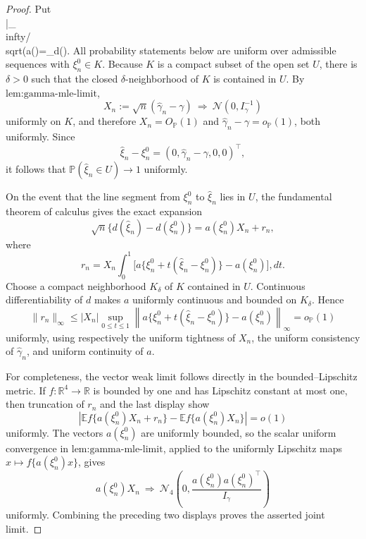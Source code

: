 \documentclass{article}
\begin{document}
\begin{proof}
Put \\|\_\\infty/\\sqrt(a(\xi)=\partial\_\gamma d(\xi)\).  All probability statements below are uniform over admissible sequences with \(\xi_n^0\in K\).  Because \(K\) is a compact subset of the open set \(U\), there is \(\delta>0\) such that the closed \(\delta\)-neighborhood of \(K\) is contained in \(U\).  By \(\text{lem:gamma-mle-limit}\),
\[
 X_n:=\sqrt n(\widehat\gamma_n-\gamma)
 \ \Rightarrow\ \mathcal N(0,I_\gamma^{-1})
\]
uniformly on \(K\), and therefore \(X_n=O_{\mathbb P}(1)\) and \(\widehat\gamma_n-\gamma=o_{\mathbb P}(1)\), both uniformly.  Since
\[
 \widehat\xi_n-\xi_n^0=(0,\widehat\gamma_n-\gamma,0,0)^\top,
\]
it follows that \(\mathbb P(\widehat\xi_n\in U)\to1\) uniformly.

On the event that the line segment from \(\xi_n^0\) to \(\widehat\xi_n\) lies in \(U\), the fundamental theorem of calculus gives the exact expansion
\[
 \sqrt n\{d(\widehat\xi_n)-d(\xi_n^0)\}
 =a(\xi_n^0)X_n+r_n,
\]
where
\[
 r_n=X_n\int_0^1
 \bigl[a\{\xi_n^0+t(\widehat\xi_n-\xi_n^0)\}-a(\xi_n^0)\bigr],dt.
\]
Choose a compact neighborhood \(K_\delta\) of \(K\) contained in \(U\).  Continuous differentiability of \(d\) makes \(a\) uniformly continuous and bounded on \(K_\delta\).  Hence
\[
 \|r_n\|_\infty
 \le |X_n|\sup_{0\le t\le1}
 \left\|a\{\xi_n^0+t(\widehat\xi_n-\xi_n^0)\}-a(\xi_n^0)\right\|_\infty
 =o_{\mathbb P}(1)
\]
uniformly, using respectively the uniform tightness of \(X_n\), the uniform consistency of \(\widehat\gamma_n\), and uniform continuity of \(a\).

For completeness, the vector weak limit follows directly in the bounded--Lipschitz metric.  If \(f:\mathbb R^4\to\mathbb R\) is bounded by one and has Lipschitz constant at most one, then truncation of \(r_n\) and the last display show
\[
 \left|\mathbb E f\{a(\xi_n^0)X_n+r_n\}
       -\mathbb E f\{a(\xi_n^0)X_n\}\right|=o(1)
\]
uniformly.  The vectors \(a(\xi_n^0)\) are uniformly bounded, so the scalar uniform convergence in \(\text{lem:gamma-mle-limit}\), applied to the uniformly Lipschitz maps \(x\mapsto f\{a(\xi_n^0)x\}\), gives
\[
 a(\xi_n^0)X_n\ \Rightarrow\
 \mathcal N_4\!\left(0,
   \frac{a(\xi_n^0)a(\xi_n^0)^\top}{I_\gamma}\right)
\]
uniformly.  Combining the preceding two displays proves the asserted joint limit.


\end{proof}
\end{document}
